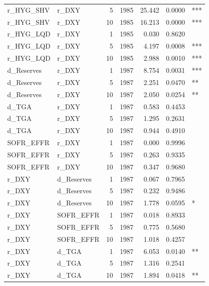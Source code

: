 \begin{table}[htbp]
\begin{tabular}{llrrrrl}
  r\_HYG\_SHV & r\_DXY & 5 & 1985 & 25.442 & 0.0000 & *** \\ 
  r\_HYG\_SHV & r\_DXY & 10 & 1985 & 16.213 & 0.0000 & *** \\ 
  r\_HYG\_LQD & r\_DXY & 1 & 1985 & 0.030 & 0.8620 &     \\ 
  r\_HYG\_LQD & r\_DXY & 5 & 1985 & 4.197 & 0.0008 & *** \\ 
  r\_HYG\_LQD & r\_DXY & 10 & 1985 & 2.988 & 0.0010 & *** \\ 
  d\_Reserves & r\_DXY & 1 & 1987 & 8.754 & 0.0031 & *** \\ 
  d\_Reserves & r\_DXY & 5 & 1987 & 2.251 & 0.0470 &  ** \\ 
  d\_Reserves & r\_DXY & 10 & 1987 & 2.050 & 0.0254 &  ** \\ 
  d\_TGA & r\_DXY & 1 & 1987 & 0.583 & 0.4453 &     \\ 
  d\_TGA & r\_DXY & 5 & 1987 & 1.295 & 0.2631 &     \\ 
  d\_TGA & r\_DXY & 10 & 1987 & 0.944 & 0.4910 &     \\ 
  SOFR\_EFFR & r\_DXY & 1 & 1987 & 0.000 & 0.9996 &     \\ 
  SOFR\_EFFR & r\_DXY & 5 & 1987 & 0.263 & 0.9335 &     \\ 
  SOFR\_EFFR & r\_DXY & 10 & 1987 & 0.347 & 0.9680 &     \\ 
  r\_DXY & d\_Reserves & 1 & 1987 & 0.067 & 0.7965 &     \\ 
  r\_DXY & d\_Reserves & 5 & 1987 & 0.232 & 0.9486 &     \\ 
  r\_DXY & d\_Reserves & 10 & 1987 & 1.778 & 0.0595 &   * \\ 
  r\_DXY & SOFR\_EFFR & 1 & 1987 & 0.018 & 0.8933 &     \\ 
  r\_DXY & SOFR\_EFFR & 5 & 1987 & 0.775 & 0.5680 &     \\ 
  r\_DXY & SOFR\_EFFR & 10 & 1987 & 1.018 & 0.4257 &     \\ 
  r\_DXY & d\_TGA & 1 & 1987 & 6.053 & 0.0140 &  ** \\ 
  r\_DXY & d\_TGA & 5 & 1987 & 1.316 & 0.2541 &     \\ 
  r\_DXY & d\_TGA & 10 & 1987 & 1.894 & 0.0418 &  ** \\ 
   \bottomrule
\end{tabular}
\end{table}
